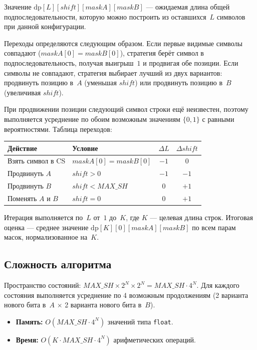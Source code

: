 \documentclass[12pt,a4paper]{article}
\begin{document}
Значение $\mathrm{dp}[L][\mathit{shift}][\mathit{maskA}][\mathit{maskB}]$ --- ожидаемая длина общей подпоследовательности, которую можно построить из оставшихся~$L$ символов при данной конфигурации.

Переходы определяются следующим образом.
Если первые видимые символы совпадают ($\mathit{maskA}[0] = \mathit{maskB}[0]$), стратегия берёт символ в подпоследовательность, получая выигрыш~$1$ и продвигая обе позиции.
Если символы не совпадают, стратегия выбирает лучший из двух вариантов: продвинуть позицию в~$A$ (уменьшая $\mathit{shift}$) или продвинуть позицию в~$B$ (увеличивая $\mathit{shift}$).

При продвижении позиции следующий символ строки ещё неизвестен, поэтому выполняется усреднение по обоим возможным значениям $\{0, 1\}$ с равными вероятностями.
Таблица переходов:

\begin{center}
\begin{tabular}{llcc}
  \toprule
  \textbf{Действие} & \textbf{Условие} & $\Delta L$ & $\Delta \mathit{shift}$ \\
  \midrule
  Взять символ в CS & $\mathit{maskA}[0] = \mathit{maskB}[0]$ & $-1$ & $0$ \\
  Продвинуть $A$ & $\mathit{shift} > 0$ & $-1$ & $-1$ \\
  Продвинуть $B$ & $\mathit{shift} < \mathit{MAX\_SH}$ & $0$ & $+1$ \\
  Поменять $A$ и $B$ & $\mathit{shift} = 0$ & $0$ & $+1$ \\
  \bottomrule
\end{tabular}
\end{center}

Итерация выполняется по~$L$ от~$1$ до~$K$, где $K$ --- целевая длина строк.
Итоговая оценка --- среднее значение $\mathrm{dp}[K][0][\mathit{maskA}][\mathit{maskB}]$ по всем парам масок, нормализованное на~$K$.

\subsection{Сложность алгоритма}

Пространство состояний: $\mathit{MAX\_SH} \times 2^N \times 2^N = \mathit{MAX\_SH} \cdot 4^N$.
Для каждого состояния выполняется усреднение по 4 возможным продолжениям (2 варианта нового бита в~$A$ $\times$ 2 варианта нового бита в~$B$).

\begin{itemize}
  \item \textbf{Память:} $O(\mathit{MAX\_SH} \cdot 4^N)$ значений типа \texttt{float}.
  \item \textbf{Время:} $O(K \cdot \mathit{MAX\_SH} \cdot 4^N)$ арифметических операций.
\end{itemize}
\end{document}
